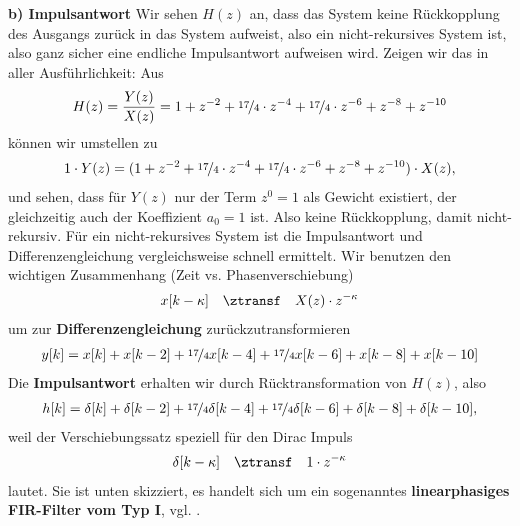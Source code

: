 \begin{ExCalc}
\textbf{b) Impulsantwort}
Wir sehen $H(z)$ an, dass das System keine Rückkopplung des Ausgangs zurück in
das System aufweist, also ein nicht-rekursives System ist, also ganz sicher
eine endliche Impulsantwort aufweisen wird.
%
Zeigen wir das in aller Ausführlichkeit: Aus
\begin{align}
H(z) = \frac{Y(z)}{X(z)}
= 1            + z^{-2} + \nicefrac{17}{4}\cdot z^{-4}  + \nicefrac{17}{4}\cdot z^{-6} + z^{-8} + z^{-10}
\end{align}
können wir umstellen zu
\begin{align}
1 \cdot Y(z)
= (1            + z^{-2} + \nicefrac{17}{4}\cdot z^{-4}  + \nicefrac{17}{4}\cdot z^{-6} + z^{-8} + z^{-10})
\cdot X(z),
\end{align}
und sehen, dass für $Y(z)$ nur der Term $z^0=1$ als Gewicht existiert, der gleichzeitig
auch der Koeffizient $a_0=1$ ist. Also keine Rückkopplung, damit nicht-rekursiv.
%
Für ein nicht-rekursives System ist die Impulsantwort und Differenzengleichung
vergleichsweise schnell ermittelt.
%
Wir benutzen den wichtigen Zusammenhang (Zeit vs. Phasenverschiebung)
\begin{align}
x[k-\kappa] \quad\ztransf\quad X(z) \cdot z^{-\kappa}
\end{align}
um zur \textbf{Differenzengleichung} zurückzutransformieren
\begin{align}
y[k] = x[k] + x[k-2] + \nicefrac{17}{4} x[k-4] + \nicefrac{17}{4} x[k-6] + x[k-8] + x[k-10]
\end{align}
Die \textbf{Impulsantwort} erhalten wir durch Rücktransformation von $H(z)$, also
\begin{align}
h[k] = \delta[k] + \delta[k-2] + \nicefrac{17}{4} \delta[k-4] + \nicefrac{17}{4} \delta[k-6] + \delta[k-8] + \delta[k-10],
\end{align}
weil der Verschiebungssatz speziell für den Dirac Impuls
\begin{align}
\delta[k-\kappa] \quad\ztransf\quad 1 \cdot z^{-\kappa}
\end{align}
lautet. Sie ist unten skizziert, es handelt sich um ein sogenanntes
\textbf{linearphasiges FIR-Filter vom Typ I}, vgl. \cite{Oppenheim2010, Oppenheim2004}.
%
\begin{center}
\end{center}
\end{ExCalc}
